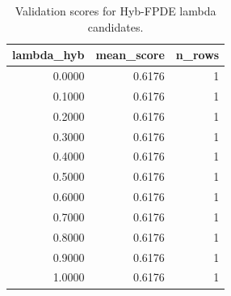 \begin{table}[t]
\caption{Validation scores for Hyb-FPDE lambda candidates.}
\label{tab:lambda_distribution_computed}
\centering
\begin{tabular}{rrr}
\toprule
lambda\_hyb & mean\_score & n\_rows \\
\midrule
0.0000 & 0.6176 & 1 \\
0.1000 & 0.6176 & 1 \\
0.2000 & 0.6176 & 1 \\
0.3000 & 0.6176 & 1 \\
0.4000 & 0.6176 & 1 \\
0.5000 & 0.6176 & 1 \\
0.6000 & 0.6176 & 1 \\
0.7000 & 0.6176 & 1 \\
0.8000 & 0.6176 & 1 \\
0.9000 & 0.6176 & 1 \\
1.0000 & 0.6176 & 1 \\
\bottomrule
\end{tabular}

\end{table}
